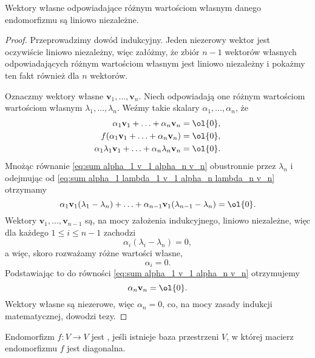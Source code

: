 \begin{lemma}
    \label{l:eigenvectors are linearly independent}
    Wektory własne odpowiadające różnym wartościom własnym danego endomorfizmu są liniowo niezależne.
\end{lemma}
\begin{proof}
    Przeprowadzimy dowód indukcyjny. Jeden niezerowy wektor jest oczywiście liniowo niezależny, więc załóżmy, że zbiór $n-1$ wektorów własnych odpowiadających różnym wartościom własnym jest liniowo niezależny i pokażmy ten fakt również dla $n$ wektorów.

    Oznaczmy wektory własne $\mathbf{v}_1, \ldots, \mathbf{v}_n$. Niech odpowiadają one różnym wartościom wartościom własnym $\lambda_1, \ldots, \lambda_n$. Weźmy takie skalary $\alpha_1, \ldots, \alpha_n$, że
    \begin{align}
        \alpha_1\mathbf{v}_1 + \ldots + \alpha_n\mathbf{v}_n &= \ol{0},
            \label{eq:sum alpha_1 v_1 alpha_n v_n} \\
        f(\alpha_1\mathbf{v}_1 + \ldots + \alpha_n\mathbf{v}_n) &= \ol{0}, \nonumber \\
        \alpha_1\lambda_1\mathbf{v}_1 + \ldots + \alpha_n\lambda_n\mathbf{v}_n &= \ol{0}.
            \label{eq:sum alpha_1 lambda_1 v_1 alpha_n lambda_n v_n}
    \end{align}
    Mnożąc równanie \ref{eq:sum alpha_1 v_1 alpha_n v_n} obustronnie przez $\lambda_n$ i odejmując od \ref{eq:sum alpha_1 lambda_1 v_1 alpha_n lambda_n v_n} otrzymamy
    \[ \alpha_1\mathbf{v}_1(\lambda_1 - \lambda_n) + \ldots + \alpha_{n-1}\mathbf{v}_1(\lambda_{n-1} - \lambda_n) = \ol{0}. \]
    Wektory $\mathbf{v}_1, \ldots, \mathbf{v}_{n-1}$ są, na mocy założenia indukcyjnego, liniowo niezależne, więc dla każdego $1 \leq i \leq n-1$ zachodzi
    \[ \alpha_i(\lambda_i - \lambda_n) = 0, \]
    a więc, skoro rozważamy różne wartości własne,
    \[ \alpha_i = 0. \]
    Podstawiając to do równości \ref{eq:sum alpha_1 v_1 alpha_n v_n} otrzymujemy
    \[ \alpha_n\mathbf{v}_n = \ol{0}. \]
    Wektory własne są niezerowe, więc $\alpha_n = 0$, co, na mocy zasady indukcji matematycznej, dowodzi tezy.
\end{proof}

\begin{definition}
    Endomorfizm $f : V \to V$ jest , jeśli istnieje baza przestrzeni $V$, w której macierz endomorfizmu $f$ jest diagonalna.
\end{definition}

